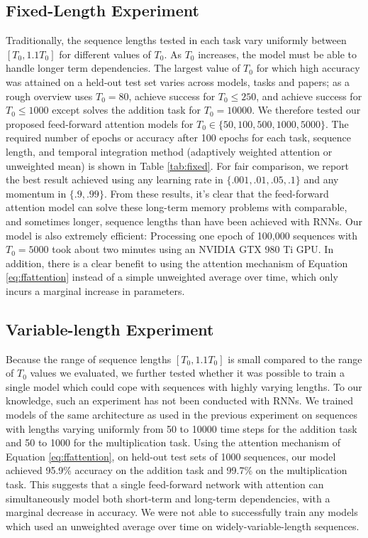 \documentclass{article} %
\begin{document}
\subsection{Fixed-Length Experiment}
\label{sec:fixed}

Traditionally, the sequence lengths tested in each task vary uniformly between $[T_0, 1.1T_0]$ for different values of $T_0$.
As $T_0$ increases, the model must be able to handle longer term dependencies.
The largest value of $T_0$ for which high accuracy was attained on a held-out test set varies across models, tasks and papers; as a rough overview \cite{sutskever2013importance} uses $T_0 = 80$, \cite{le2015simple,martens2011learning} achieve success for $T_0 \le 250$, and \cite{jaegar2012long,hochreiter1997long} achieve success for $T_0 \le 1000$ except \cite{jaegar2012long} solves the addition task for $T_0 = 10000$.
We therefore tested our proposed feed-forward attention models for $T_0 \in \{50, 100, 500, 1000, 5000\}$.
The required number of epochs or accuracy after 100 epochs for each task, sequence length, and temporal integration method (adaptively weighted attention or unweighted mean) is shown in Table \ref{tab:fixed}.
For fair comparison, we report the best result achieved using any learning rate in $\{.001, .01, .05, .1\}$ and any momentum in $\{.9, .99\}$.
From these results, it's clear that the feed-forward attention model can solve these long-term memory problems with comparable, and sometimes longer, sequence lengths than have been achieved with RNNs.
Our model is also extremely efficient: Processing one epoch of 100,000 sequences with $T_0 = 5000$ took about two minutes using an NVIDIA GTX 980 Ti GPU.
In addition, there is a clear benefit to using the attention mechanism of Equation \ref{eq:ffattention} instead of a simple unweighted average over time, which only incurs a marginal increase in parameters.

\subsection{Variable-length Experiment}

Because the range of sequence lengths $[T_0, 1.1T_0]$ is small compared to the range of $T_0$ values we evaluated, we further tested whether it was possible to train a single model which could cope with sequences with highly varying lengths.
To our knowledge, such an experiment has not been conducted with RNNs.
We trained models of the same architecture as used in the previous experiment on sequences with lengths varying uniformly from 50 to 10000 time steps for the addition task and 50 to 1000 for the multiplication task.
Using the attention mechanism of Equation \ref{eq:ffattention}, on held-out test sets of 1000 sequences, our model achieved 95.9\% accuracy on the addition task and 99.7\% on the multiplication task.
This suggests that a single feed-forward network with attention can simultaneously model both short-term and long-term dependencies, with a marginal decrease in accuracy.
We were not able to successfully train any models which used an unweighted average over time on widely-variable-length sequences.
\end{document}
